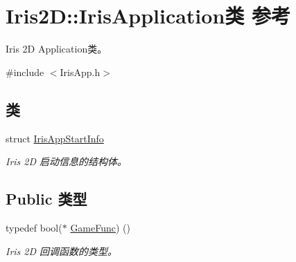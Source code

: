 \hypertarget{class_iris2_d_1_1_iris_application}{}\section{Iris2D\+:\+:Iris\+Application类 参考}
\label{class_iris2_d_1_1_iris_application}


Iris 2D Application类。  




{\ttfamily \#include $<$Iris\+App.\+h$>$}

\subsection*{类}
\begin{DoxyCompactItemize}
\item 
struct \hyperlink{struct_iris2_d_1_1_iris_application_1_1_iris_app_start_info}{Iris\+App\+Start\+Info}
\begin{DoxyCompactList}\small\item\em Iris 2D 启动信息的结构体。 \end{DoxyCompactList}\end{DoxyCompactItemize}
\subsection*{Public 类型}
\begin{DoxyCompactItemize}
\item 
\mbox{\label{class_iris2_d_1_1_iris_application_ac74720e6cd3a1968f73e92ea99675884}} 
typedef bool($\ast$ \hyperlink{class_iris2_d_1_1_iris_application_ac74720e6cd3a1968f73e92ea99675884}{Game\+Func}) ()
\begin{DoxyCompactList}\small\item\em Iris 2D 回调函数的类型。 \end{DoxyCompactList}\end{DoxyCompactItemize}
